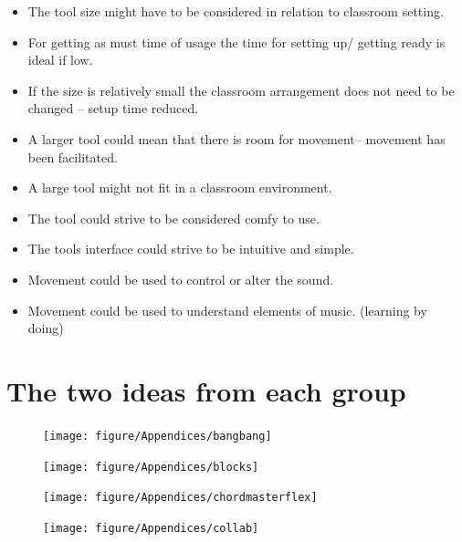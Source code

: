 \begin{itemize}
\item	The tool size might have to be considered in relation to classroom setting. 
\item	For getting as must time of usage the time for setting up/ getting ready is ideal if low. 
\item	If the size is relatively small the classroom arrangement does not need to be changed – setup time reduced. 
\item	A larger tool could mean that there is room for movement– movement has been facilitated. 
\item	A large tool might not fit in a classroom environment.
\item	The tool could strive to be considered comfy to use.   
\item	The tools interface could strive to be intuitive and simple.
\item	Movement could be used to control or alter the sound. 
\item	Movement could be used to understand elements of music. (learning by doing) 
\end{itemize}

\section{The two ideas from each group}


\begin{figure}[H]
	\centering
	\texttt{[image: figure/Appendices/bangbang]}
	\label{fig:bangbang}
	\caption{}
	
\end{figure}

\begin{figure}[H]
	\centering
	\texttt{[image: figure/Appendices/blocks]}
	\label{fig:blocks}
	\caption{}
	
\end{figure}

\begin{figure}[H]
	\centering
	\texttt{[image: figure/Appendices/chordmasterflex]}
	\label{fig:chordmasterflex}
	\caption{}
	
\end{figure}

\begin{figure}[H]
	\centering
	\texttt{[image: figure/Appendices/collab]}
	\label{fig:collab}
	\caption{}
	
\end{figure}

